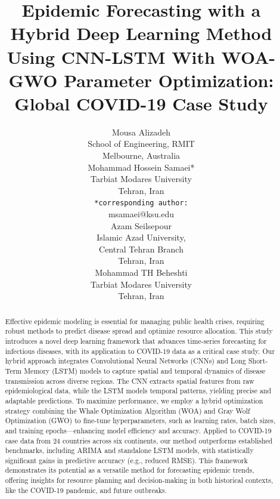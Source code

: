 \documentclass{article}
\title{Epidemic Forecasting with a Hybrid Deep Learning Method Using CNN-LSTM With WOA-GWO Parameter Optimization: Global COVID-19 Case Study}
\author{
  Mousa Alizadeh \\
  School of Engineering, RMIT \\
  Melbourne, Australia \\
  \And
    Mohammad Hossein Samaei* \\
  Tarbiat Modares University \\
  Tehran, Iran \\
  \texttt{*corresponding author:}\\
  msamaei@ksu.edu \\
    \And
  Azam Seilsepour \\
  Islamic Azad University,\\
  Central Tehran Branch \\
  Tehran, Iran \\
  \And
  Mohammad TH Beheshti \\
  Tarbiat Modares University \\
  Tehran, Iran \\
}
\begin{document}
\maketitle
\begin{abstract}
Effective epidemic modeling is essential for managing public health crises, requiring robust methods to predict disease spread and optimize resource allocation. This study introduces a novel deep learning framework that advances time-series forecasting for infectious diseases, with its application to COVID-19 data as a critical case study. Our hybrid approach integrates Convolutional Neural Networks (CNNs) and Long Short-Term Memory (LSTM) models to capture spatial and temporal dynamics of disease transmission across diverse regions. The CNN extracts spatial features from raw epidemiological data, while the LSTM models temporal patterns, yielding precise and adaptable predictions. To maximize performance, we employ a hybrid optimization strategy combining the Whale Optimization Algorithm (WOA) and Gray Wolf Optimization (GWO) to fine-tune hyperparameters, such as learning rates, batch sizes, and training epochs—enhancing model efficiency and accuracy. Applied to COVID-19 case data from 24 countries across six continents, our method outperforms established benchmarks, including ARIMA and standalone LSTM models, with statistically significant gains in predictive accuracy (e.g., reduced RMSE). This framework demonstrates its potential as a versatile method for forecasting epidemic trends, offering insights for resource planning and decision-making in both historical contexts, like the COVID-19 pandemic, and future outbreaks.
\end {abstract}



{}
\maketitle
\end{document}
